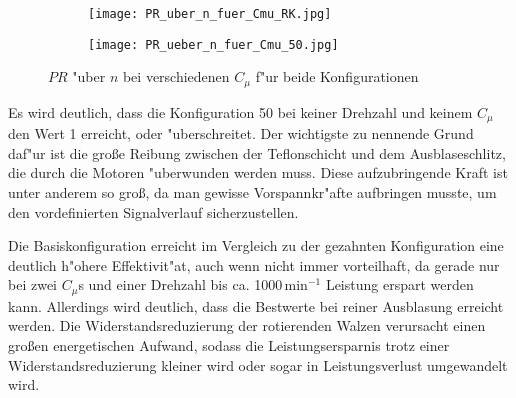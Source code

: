 \begin{figure}[h]
	\centering
	\begin{subfigure}[c]{0.45\textwidth}		
		\texttt{[image: PR\_uber\_n\_fuer\_Cmu\_RK.jpg]}
		\label{fig:PR RK}
	\end{subfigure}
	\begin{subfigure}[c]{0.45\textwidth}
		\texttt{[image: PR\_ueber\_n\_fuer\_Cmu\_50.jpg]}
		\label{fig:PR 50}
	\end{subfigure}
		\caption{$PR$ "uber $n$ bei verschiedenen $C_{\mu}$ f"ur beide Konfigurationen}
	\label{fig:PR}
\end{figure}

Es wird deutlich, dass die Konfiguration 50 bei keiner Drehzahl und keinem $C_{\mu}$ den Wert 1 erreicht, oder "uberschreitet. Der wichtigste zu nennende Grund daf"ur ist die gro\ss{}e Reibung zwischen der Teflonschicht und dem Ausblaseschlitz, die durch die Motoren "uberwunden werden muss. Diese aufzubringende Kraft ist unter anderem so gro\ss{}, da man gewisse Vorspannkr"afte aufbringen musste, um den vordefinierten Signalverlauf sicherzustellen.

Die Basiskonfiguration erreicht im Vergleich zu der gezahnten Konfiguration eine deutlich h"ohere Effektivit"at, auch wenn nicht immer vorteilhaft, da gerade nur bei zwei $C_{\mu}$s und einer Drehzahl bis ca. 1000\,$\mathrm{min^{-1}}$ Leistung erspart werden kann. Allerdings wird deutlich, dass die Bestwerte bei reiner Ausblasung erreicht werden. Die Widerstandsreduzierung der rotierenden Walzen verursacht einen gro\ss{}en energetischen Aufwand, sodass die Leistungsersparnis trotz einer Widerstandsreduzierung kleiner wird oder sogar in Leistungsverlust umgewandelt wird.